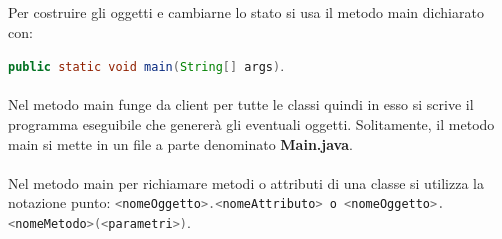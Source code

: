 \documentclass{subfile}
\begin{document}
    Per costruire gli oggetti e cambiarne lo stato si usa il metodo main dichiarato con:

    \lstinline[language = java]{public static void main(String[] args)}.\\\\
    Nel metodo main funge da client per tutte le classi quindi in esso si scrive il programma eseguibile che genererà gli 
    eventuali oggetti. Solitamente, il metodo main si mette in un file a parte denominato \textbf{Main.java}.\\\\
    Nel metodo main per richiamare metodi o attributi di una classe si utilizza la notazione punto: 
    \lstinline[language = java]{<nomeOggetto>.<nomeAttributo> o <nomeOggetto>.<nomeMetodo>(<parametri>)}.\\
\end{document}
